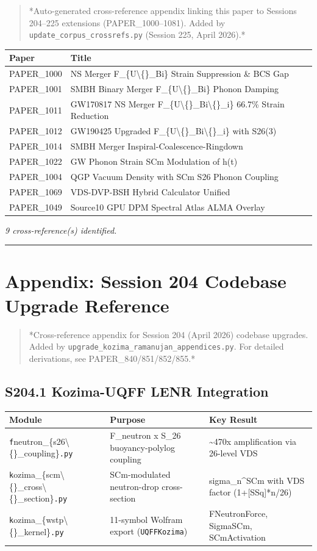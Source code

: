\documentclass[11pt]{article}
\begin{document}
\begin{quote}
*Auto-generated cross-reference appendix linking this paper to
Sessions 204--225 extensions (PAPER\_1000--1081). Added by
\verb|update_corpus_crossrefs.py| (Session 225, April 2026).*
\end{quote}

\begin{center}
\begin{longtable}{ll}
\toprule
Paper & Title \tabularnewline
\midrule
\endhead
PAPER\_1000 & NS Merger F\_\{U\textbackslash\{\}\_Bi\} Strain Suppression \& BCS Gap \tabularnewline
PAPER\_1001 & SMBH Binary Merger F\_\{U\textbackslash\{\}\_Bi\} Phonon Damping \tabularnewline
PAPER\_1011 & GW170817 NS Merger F\_\{U\textbackslash\{\}\_Bi\textbackslash\{\}\_i\} 66.7\% Strain Reduction \tabularnewline
PAPER\_1012 & GW190425 Upgraded F\_\{U\textbackslash\{\}\_Bi\textbackslash\{\}\_i\} with S26(3) \tabularnewline
PAPER\_1014 & SMBH Merger Inspiral-Coalescence-Ringdown \tabularnewline
PAPER\_1022 & GW Phonon Strain SCm Modulation of h(t) \tabularnewline
PAPER\_1004 & QGP Vacuum Density with SCm S26 Phonon Coupling \tabularnewline
PAPER\_1069 & VDS-DVP-BSH Hybrid Calculator Unified \tabularnewline
PAPER\_1049 & Source10 GPU DPM Spectral Atlas ALMA Overlay \tabularnewline
\bottomrule
\end{longtable}
\end{center}

\emph{9 cross-reference(s) identified.}

\noindent\rule{\textwidth}{0.4pt}

\section*{Appendix: Session 204 Codebase Upgrade Reference}

\begin{quote}
*Cross-reference appendix for Session 204 (April 2026) codebase upgrades.
Added by \verb|upgrade_kozima_ramanujan_appendices.py|. For detailed derivations,
see PAPER\_840/851/852/855.*
\end{quote}

\subsection*{S204.1 Kozima-UQFF LENR Integration}

\begin{center}
\begin{longtable}{lll}
\toprule
Module & Purpose & Key Result \tabularnewline
\midrule
\endhead
\verb|f|neutron\_\{s26\textbackslash\{\}\_coupling\}\verb|.py| & F\_neutron x S\_26 buoyancy-polylog coupling & \textasciitilde{}470x amplification via 26-level VDS \tabularnewline
\verb|k|ozima\_\{scm\textbackslash\{\}\_cross\textbackslash\{\}\_section\}\verb|.py| & SCm-modulated neutron-drop cross-section & sigma\_n\textasciicircum{}SCm with VDS factor (1+[SSq]*n/26) \tabularnewline
\verb|k|ozima\_\{wstp\textbackslash\{\}\_kernel\}\verb|.py| & 11-symbol Wolfram export (\verb|UQFFKozima|) & FNeutronForce, SigmaSCm, SCmActivation \tabularnewline
\bottomrule
\end{longtable}
\end{center}
\end{document}
